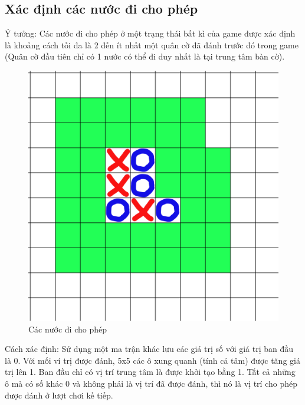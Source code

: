 \documentclass[12pt]{report}
\begin{document}
\subsection{Xác định các nước đi cho phép}
Ý tưởng: Các nước đi cho phép ở một trạng thái bất kì của game được xác định là khoảng cách tối đa 
là 2 đến ít nhất một quân cờ đã đánh trước đó trong game 
(Quân cờ đầu tiên chỉ có 1 nước có thể đi duy nhất là tại trung tâm bàn cờ). 
\begin{figure}[H]
\centering
\caption{Các nước đi cho phép}
\includegraphics[width=12cm]{legal-actions.png}
\end{figure}

\noindent Cách xác định: Sử dụng một ma trận khác lưu các giá trị số với giá trị ban đầu là 0. 
Với mối ví trị được đánh, 5x5 các ô xung quanh (tính cả tâm) được tăng giá trị lên 1. 
Ban đầu chỉ có vị trí trung tâm là được khởi tạo bằng 1. 
Tất cả những ô mà có số khác 0 và không phải là vị trí đã được đánh, 
thì nó là vị trí cho phép được đánh ở lượt chơi kế tiếp. 
\end{document}
